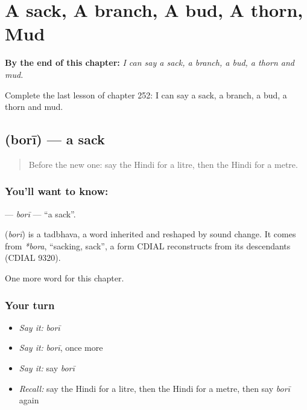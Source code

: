 
\chapter{A sack, A branch, A bud, A thorn, Mud}
\label{ch:hi-a-sack-a-branch-a-bud-a-thorn-mud}

\begin{chapteropening}
\textbf{By the end of this chapter:} \emph{I can say a sack, a branch, a bud, a thorn and mud.}

Complete the last lesson of chapter 252: I can say a sack, a branch, a bud, a thorn and mud.
\end{chapteropening}

\section[\texorpdfstring{\hi{बोरी} (borī)}{बोरी (borī)}]{ (borī) — a sack}

\label{lesson:HI-C252-bori}



\begin{quote}
Before the new one: say the Hindi for a litre, then the Hindi for a metre.
\end{quote}

\subsection*{You'll want to know: }
\textbf{} — \emph{borī} — \textquotedblleft{}a sack\textquotedblright{}.

\begin{cousinweb}
\textbf{} (\emph{borī}) is a tadbhava, a word inherited and reshaped by sound change. It comes from \emph{*bora}, \textquotedblleft{}sacking, sack\textquotedblright{}, a form CDIAL reconstructs from its descendants (CDIAL 9320).
\end{cousinweb}

\begin{grammarlens}[title={What you've built}]
One more word for this chapter.
\end{grammarlens}

\subsection*{Your turn}
\begin{itemize}
\raggedright
  \item \emph{Say it:} \emph{borī}
  \item \emph{Say it:} \emph{borī}, once more
  \item \emph{Say it:} say \emph{borī}
  \item \emph{Recall:} say the Hindi for a litre, then the Hindi for a metre, then say \emph{borī} again
\end{itemize}

